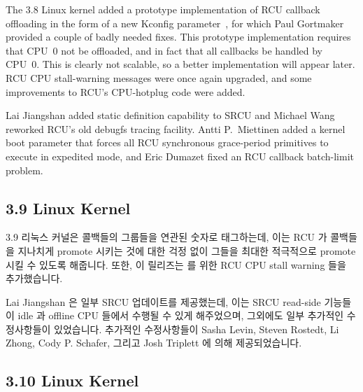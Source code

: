 The 3.8 Linux kernel added a prototype implementation of RCU callback
offloading in the form of a new  Kconfig
parameter~\cite{JonCorbet2012NOCB}, for which Paul Gortmaker provided
a couple of badly needed fixes.
This prototype implementation requires that CPU~0 not be offloaded,
and in fact that all callbacks be handled by CPU~0.
This is clearly not scalable, so a better implementation will appear later.
RCU CPU stall-warning messages were once again upgraded, and some
improvements to RCU's CPU-hotplug code were added.

Lai Jiangshan added static definition capability to SRCU and Michael
Wang reworked RCU's old debugfs tracing facility.
Antti P.~Miettinen added a kernel boot parameter that forces all RCU
synchronous grace-period primitives to execute in expedited mode,
and Eric Dumazet fixed an RCU callback batch-limit problem.
\fi

\subsection{3.9 Linux Kernel}

3.9 리눅스 커널은 콜백들의 그룹들을 연관된 숫자로 태그하는데, 이는 RCU 가
콜백들을 지나치게 promote 시키는 것에 대한 걱정 없이 그들을 최대한 적극적으로
promote 시킬 수 있도록 해줍니다.
또한, 이 릴리즈는  를 위한 RCU CPU stall warning 들을
추가했습니다.

Lai Jiangshan 은 일부 SRCU 업데이트를 제공했는데, 이는 SRCU read-side 기능들이
idle 과 offline CPU 들에서 수행될 수 있게 해주었으며, 그외에도 일부 추가적인
수정사항들이 있었습니다.
추가적인 수정사항들이 Sasha Levin, Steven Rostedt, Li Zhong, Cody P. Schafer,
그리고 Josh Triplett 에 의해 제공되었습니다.

\subsection{3.10 Linux Kernel}

